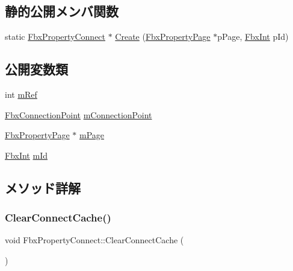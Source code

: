 \subsection*{静的公開メンバ関数}
\begin{DoxyCompactItemize}
\item 
static \hyperlink{class_fbx_property_connect}{Fbx\+Property\+Connect} $\ast$ \hyperlink{class_fbx_property_connect_aa9dc912c6e7b5185f0afa7af81c55e85}{Create} (\hyperlink{class_fbx_property_page}{Fbx\+Property\+Page} $\ast$p\+Page, \hyperlink{fbxtypes_8h_a088fa96de3b0b3ea69f0f6afef525dfb}{Fbx\+Int} p\+Id)
\end{DoxyCompactItemize}
\subsection*{公開変数類}
\begin{DoxyCompactItemize}
\item 
int \hyperlink{class_fbx_property_connect_a4bc3cc9dabbd6ffb4e25ab37b84f80b4}{m\+Ref}
\item 
\hyperlink{class_fbx_connection_point}{Fbx\+Connection\+Point} \hyperlink{class_fbx_property_connect_a35dc1915c687d3d2b51a55c7eba0e80c}{m\+Connection\+Point}
\item 
\hyperlink{class_fbx_property_page}{Fbx\+Property\+Page} $\ast$ \hyperlink{class_fbx_property_connect_a08654feca214b0f552c333115c6264fe}{m\+Page}
\item 
\hyperlink{fbxtypes_8h_a088fa96de3b0b3ea69f0f6afef525dfb}{Fbx\+Int} \hyperlink{class_fbx_property_connect_abce4165e9ad7ed40341d8988763f083c}{m\+Id}
\end{DoxyCompactItemize}


\subsection{メソッド詳解}
\mbox{\label{class_fbx_property_connect_a993c2baae886bb7259a5246ef2e791f3}} 
\subsubsection{\texorpdfstring{Clear\+Connect\+Cache()}{ClearConnectCache()}}
{\footnotesize\ttfamily void Fbx\+Property\+Connect\+::\+Clear\+Connect\+Cache (\begin{DoxyParamCaption}{ }\end{DoxyParamCaption})}

